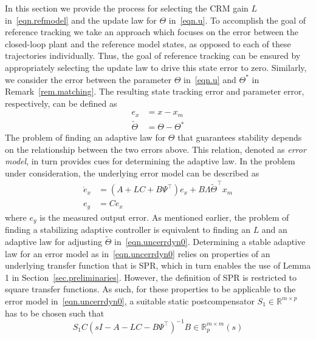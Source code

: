 \documentclass[]{../sty/aiaa-tc}
\begin{document}
  In this section we provide the process for selecting the CRM gain $L$ in\ \eqref{eqn.refmodel} and the update law for $\Theta$ in\ \eqref{eqn.u}.
  To accomplish the goal of reference tracking we take an approach which focuses on the error between the closed-loop plant and the reference model states, as opposed to each of these trajectories individually.
  Thus, the goal of reference tracking can be ensured by appropriately selecting the update law to drive this state error to zero.
  Similarly, we consider the error between the parameter $\Theta$ in\ \eqref{eqn.u} and $\Theta^{*}$ in Remark~\ref{rem.matching}.
  The resulting state tracking error and parameter error, respectively, can be defined as
  \begin{align*}
    e_{x}&=x-x_{m} \\
    \widetilde{\Theta}&=\Theta-\Theta^{*}
  \end{align*}
  The problem of finding an adaptive law for $\Theta$ that guarantees stability depends on the relationship between the two errors above.
  This relation, denoted as \textit{error model}, in turn provides cues for determining the adaptive law.
  In the problem under consideration, the underlying error model can be described as
  \begin{equation}
    \label{eqn.uncerrdyn0}
    \begin{split}
      \dot{e}_{x}&=(A+LC+B\Psi^{\top})e_{x}+B\Lambda\widetilde{\Theta}^{\top}x_{m} \\
      e_{y}&=Ce_{x}
    \end{split}
  \end{equation}
  where $e_{y}$ is the measured output error.
  As mentioned earlier, the problem of finding a stabilizing adaptive controller is equivalent to finding an $L$ and an adaptive law for adjusting $\widetilde{\Theta}$ in\ \eqref{eqn.uncerrdyn0}.
  Determining a stable adaptive law for an error model as in\ \eqref{eqn.uncerrdyn0} relies on properties of an underlying transfer function that is SPR\cite{narendra.stable.2005}, which in turn enables the use of  Lemma 1 in Section~\ref{sec.preliminaries}.
  However, the definition of SPR is restricted to square transfer functions.
  As such, for these properties to be applicable to the error model in\ \eqref{eqn.uncerrdyn0}, a suitable static postcompensator $S_1\in\mathbb{R}^{m\times p}$ has to be chosen such that
  \begin{equation*}
    S_{1}C(sI-A-LC-B\Psi^{\top})^{-1}B \in\mathbb{R}_{p}^{m\times m}(s)
  \end{equation*}
\end{document}
